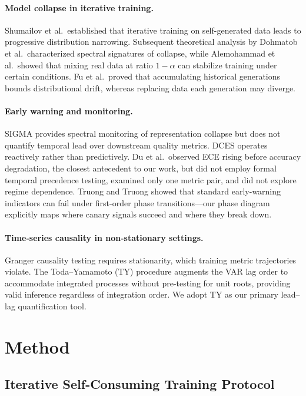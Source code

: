 \documentclass[letterpaper,11pt]{article}
\begin{document}
\paragraph{Model collapse in iterative training.}
Shumailov et al.\ established that iterative training on self-generated data leads to progressive distribution narrowing. Subsequent theoretical analysis by Dohmatob et al.\ characterized spectral signatures of collapse, while Alemohammad et al.\ showed that mixing real data at ratio $1-\alpha$ can stabilize training under certain conditions. Fu et al.\ proved that accumulating historical generations bounds distributional drift, whereas replacing data each generation may diverge.

\paragraph{Early warning and monitoring.}
SIGMA provides spectral monitoring of representation collapse but does not quantify temporal lead over downstream quality metrics. DCES operates reactively rather than predictively. Du et al.\ observed ECE rising before accuracy degradation, the closest antecedent to our work, but did not employ formal temporal precedence testing, examined only one metric pair, and did not explore regime dependence. Truong and Truong showed that standard early-warning indicators can fail under first-order phase transitions---our phase diagram explicitly maps where canary signals succeed and where they break down.

\paragraph{Time-series causality in non-stationary settings.}
Granger causality testing requires stationarity, which training metric trajectories violate. The Toda--Yamamoto (TY) procedure augments the VAR lag order to accommodate integrated processes without pre-testing for unit roots, providing valid inference regardless of integration order. We adopt TY as our primary lead--lag quantification tool.

\section{Method}

\subsection{Iterative Self-Consuming Training Protocol}
\end{document}

